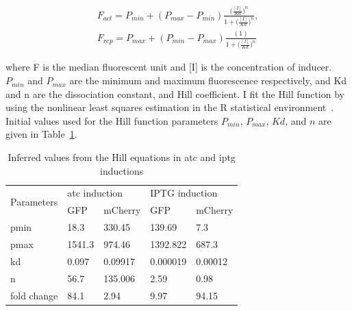 \begin{align}
 	F_{act} = P_{min} + (P_{max} - P_{min})\frac{\Big(\frac{[I]}{Kd}\Big)^n}{1+\Big(\frac{[I]}{Kd}\Big)^n},\\
 	F_{rep} = P_{max} + (P_{min} - P_{max})\frac{(1)}{1+\Big(\frac{[I]}{Kd}\Big)^n}
\end{align}
 
\noindent where F is the median fluorescent unit and [I] is the concentration of inducer. $P_{min}$ and $P_{max}$ are the minimum and maximum fluorescence respectively, and Kd and n are the dissociation constant, and Hill coefficient. I fit the Hill function by using the nonlinear least squares estimation in the R statistical environment~\autocite{R:2008}. Initial values used for the Hill function parameters $P_{min}$, $P_{max}$, $Kd$, and $n$ are given in Table~\ref{tab:hill_initial}.




\begin{table}[htbp]
\centering
\caption{Inferred values from the Hill equations in \acrshort{atc} and \acrshort{iptg} inductions}
\label{tab:hill_initial}
\begin{tabular}{@{}lllll@{}}
\toprule
\multirow{2}{*}{Parameters} & \multicolumn{2}{l}{\acrshort{atc} induction} & \multicolumn{2}{l}{IPTG induction} \\ \cmidrule(l){2-5} 
 & GFP & mCherry & GFP & mCherry \\ \midrule
pmin & 18.3 & 330.45 & 139.69 & 7.3 \\
pmax & 1541.3 & 974.46 & 1392.822 & 687.3 \\
kd & 0.097 & 0.09917 & 0.000019 & 0.00012\\
n & 56.7 & 135.006 & 2.59 & 0.98\\ 
fold change & 84.1 & 2.94 & 9.97 & 94.15 \\ \bottomrule
\end{tabular}
\end{table}

